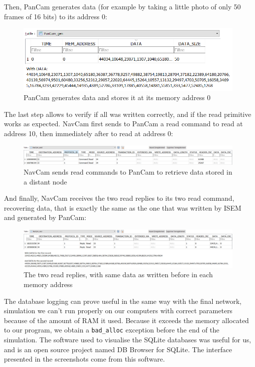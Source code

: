 \documentclass[12pt,a4paper]{article}
\begin{document}
Then, PanCam generates data (for example by taking a little photo of only 50 frames of 16 bits) to its address 0:
\begin{figure}[h]
\centering
\includegraphics[scale=.4]{database_screenshots/PanCam_gen}
\caption{PanCam generates data and stores it at its memory address 0}
\end{figure}
\smallbreak
The last step allows to verify if all was written correctly, and if the read primitive works as expected. NavCam first sends to PanCam a read command to read at address 10, then immediately after to read at address 0:
\begin{figure}[h]
\centering
\includegraphics[scale=.4]{database_screenshots/NavCam_send}
\caption{NavCam sends read commands to PanCam to retrieve data stored in a distant node}
\end{figure}
\smallbreak
And finally, NavCam receives the two read replies to its two read command, recovering data, that is exactly the same as the one that was written by ISEM and generated by PanCam:
\begin{figure}[h]
\centering
\includegraphics[scale=.4]{database_screenshots/NavCam_recv}
\caption{The two read replies, with same data as written before in each memory address}
\end{figure}
The database logging can prove useful in the same way with the final network, simulation we can't run properly on our computers with correct parameters because of the amount of RAM it used. Because it exceeds the memory allocated to our program, we obtain a \texttt{bad\_alloc} exception before the end of the simulation. The software used to visualise the SQLite databases was useful for us, and is an open source project named DB Browser for SQLite. The interface presented in the screenshots come from this software.
\end{document}
